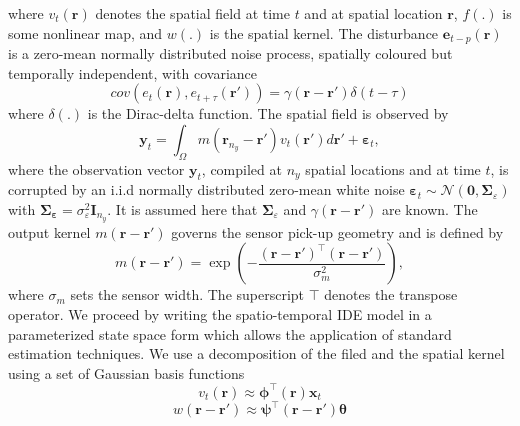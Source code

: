 \documentclass[11pt,draftcls,onecolumn,peerreview]{IEEEtran}
\begin{document}
where $v_t(\mathbf r)$ denotes the spatial field at time $t$ and at spatial location $\mathbf r$, $f(.)$ is some nonlinear map, and $w(.)$ is the spatial kernel. The disturbance $\mathbf e_{t-p}(\mathbf r)$ is a zero-mean normally distributed noise process, spatially
coloured but temporally independent, with covariance
\begin{equation}
cov\left(e_{t}\left(\mathbf{r}\right),e_{t+\tau}\left(\mathbf{r'}\right)\right)=
\gamma\left(\mathbf{r}-\mathbf{r'}\right)\delta(t-\tau)
\label{eq:FieldCovariance}
\end{equation}
where $\delta(.)$ is the Dirac-delta function.
 The spatial field is observed by
\begin{equation}
    \label{eq:ObservationEquation}
	\mathbf{y}_t =
	\int_{\Omega}{
	    m\left(\mathbf{r}_{n_y}-\mathbf{r}'\right)v_t\left(\mathbf{r}'\right)
	d\mathbf{r}'} + 
	\boldsymbol{\varepsilon}_t, 
\end{equation}
where the observation vector $\mathbf{y}_{t}$, compiled at $n_{y}$ spatial locations and at time $t$, is corrupted by an i.i.d normally distributed zero-mean white noise ${\boldsymbol\varepsilon}_t\sim \mathcal{N}\left(\mathbf{0},\boldsymbol\Sigma_{\varepsilon}\right)$ with $\mathbf{\Sigma}_{\boldsymbol\varepsilon}=\sigma_{\varepsilon}^2\mathbf I_{n_y} $. It is assumed here that $\boldsymbol\Sigma_{\varepsilon}$ and $\gamma\left(\mathbf r-\mathbf r' \right)$ are known. The output kernel $m(\mathbf{r}-\mathbf{r}')$ governs the sensor pick-up geometry and is defined by 
\begin{equation}\label{eq:SensorKernel}
	m\left(\mathbf{r}-\mathbf{r}'\right) = \exp{\left(-\frac{(\mathbf{r}-\mathbf{r}')^\top(\mathbf{r}-\mathbf{r}')}{\sigma_m^2}\right)},
\end{equation}
where $\sigma_m$ sets the sensor width. The superscript $\top$ denotes the transpose operator. We proceed by writing the spatio-temporal IDE model in a parameterized state space form which allows the application of standard estimation
techniques. We use a decomposition of the filed and the spatial kernel using a set of Gaussian basis functions
 \begin{equation}
	\label{eq:FieldDecomp} v_t\left(\mathbf{r}\right) \approx \boldsymbol{\phi}^{\top}\left(\mathbf{r}\right) \mathbf{x}_t
\end{equation}
\begin{equation}\label{eq:KernelDecomp}
	 w\left(\mathbf{r}-\mathbf{r}'\right) \approx\boldsymbol{\psi}^\top\left(\mathbf{r}-\mathbf{r}'\right) \boldsymbol{\theta}
\end{equation}
\end{document}
